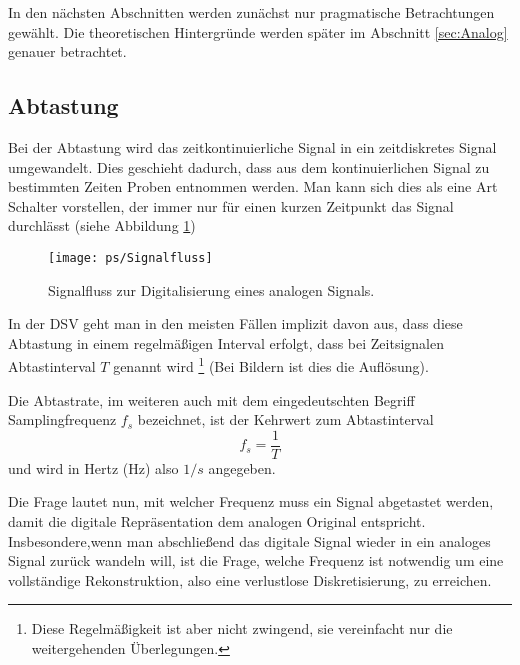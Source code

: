 In den nächsten Abschnitten werden zunächst nur pragmatische Betrachtungen gewählt. Die theoretischen
Hintergründe werden später im Abschnitt \ref{sec:Analog} genauer betrachtet.

\subsection{Abtastung \label{sec:Abtastung}}
Bei der Abtastung wird das zeitkontinuierliche Signal in ein zeitdiskretes Signal
umgewandelt. Dies geschieht dadurch, dass aus dem kontinuierlichen Signal
zu bestimmten Zeiten Proben  entnommen werden. Man kann sich dies
als eine Art Schalter vorstellen, der immer nur für einen kurzen Zeitpunkt das Signal
durchlässt (siehe Abbildung \ref{pic:SignalflussAbtastung})

\begin{figure}[H]
\begin{center}
\texttt{[image: ps/Signalfluss]}
\caption{\label{pic:SignalflussAbtastung} Signalfluss zur
Digitalisierung eines analogen Signals.}
\end{center}
\end{figure}


In der DSV geht man in den meisten Fällen implizit davon aus, dass
diese Abtastung in einem regelmäßigen Interval
erfolgt, dass bei Zeitsignalen Abtastinterval $T$ genannt wird
\footnote{Diese Regelmäßigkeit ist aber nicht zwingend, sie vereinfacht nur die weitergehenden Überlegungen.}
(Bei Bildern ist dies die Auflösung).

Die Abtastrate, im weiteren auch mit dem eingedeutschten Begriff Samplingfrequenz $f_s$ bezeichnet,
ist der Kehrwert zum Abtastinterval
\[
    f_s = \frac{1}{T}
\]
und wird in Hertz (Hz) also $1/s$ angegeben.

Die Frage lautet nun, mit welcher Frequenz muss ein Signal abgetastet werden, damit
die digitale Repräsentation dem analogen Original entspricht. Insbesondere,wenn man abschließend
das digitale Signal wieder in ein analoges Signal zurück wandeln will, ist die Frage, welche Frequenz
ist notwendig um eine vollständige Rekonstruktion, also eine verlustlose Diskretisierung,
zu erreichen.

